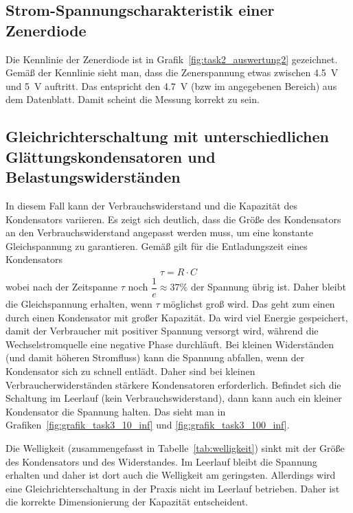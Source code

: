 \documentclass{article}
\begin{document}
\subsection{Strom-Spannungscharakteristik einer Zenerdiode}

Die Kennlinie der Zenerdiode ist in Grafik~\ref{fig:task2_auswertung2} gezeichnet. Gemäß der Kennlinie sieht man, dass die Zenerspannung etwas zwischen 4.5~V und 5~V auftritt. Das entspricht den 4.7~V (bzw im angegebenen Bereich) aus dem Datenblatt. Damit scheint die Messung korrekt zu sein.

\subsection{Gleichrichterschaltung mit unterschiedlichen Glättungskondensatoren und Belastungswiderständen}


In diesem Fall kann der Verbrauchswiderstand und die Kapazität des Kondensators variieren. Es zeigt sich deutlich, dass die Größe des Kondensators an den Verbrauchswiderstand angepasst werden muss, um eine konstante Gleichspannung zu garantieren. Gemäß \cite{demtroeder} gilt für die Entladungszeit eines Kondensators
\begin{align*}
\tau = R\cdot C
\end{align*}
wobei nach der Zeitspanne $\tau$ noch $\dfrac{1}{e} \approx 37\%$ der Spannung übrig ist. Daher bleibt die Gleichspannung erhalten, wenn $\tau$ möglichst groß wird. Das geht zum einen durch einen Kondensator mit großer Kapazität. Da wird viel Energie gespeichert, damit der Verbraucher mit positiver Spannung versorgt wird, während die Wechselstromquelle eine negative Phase durchläuft. Bei kleinen Widerständen (und damit höheren Stromfluss) kann die Spannung abfallen, wenn der Kondensator sich zu schnell entlädt. Daher sind bei kleinen Verbraucherwiderständen stärkere Kondensatoren erforderlich. Befindet sich die Schaltung im Leerlauf (kein Verbrauchswiderstand), dann kann auch ein kleiner Kondensator die Spannung halten. Das sieht man in Grafiken~\ref{fig:grafik_task3_10_inf} und \ref{fig:grafik_task3_100_inf}.


Die Welligkeit (zusammengefasst in Tabelle~\ref{tab:welligkeit}) sinkt mit der Größe des Kondensators und des Widerstandes. Im Leerlauf bleibt die Spannung erhalten und daher ist dort auch die Welligkeit am geringsten. Allerdings wird eine Gleichrichterschaltung in der Praxis nicht im Leerlauf betrieben. Daher ist die korrekte Dimensionierung der Kapazität entscheident.
\end{document}
